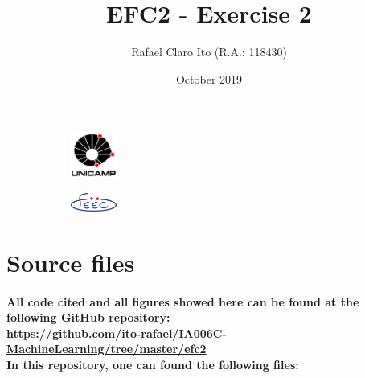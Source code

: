 \documentclass[a4paper]{article}    %
\begin{document}
\begin{figure}
    \centering
    \begin{subfigure}{0.45\textwidth}
        \centering
        \includegraphics[width=1.5cm]{unicamp}
    \end{subfigure}
    \hfill
    \begin{subfigure}{0.45\textwidth}
        \centering
        \includegraphics[width=1.5cm]{feec}
    \end{subfigure}
\end{figure}

\title{EFC2 - Exercise 2}
\author{Rafael Claro Ito (R.A.: 118430)}
\date{October 2019}
\maketitle
\newpage

\section{Source files}

\paragraph{All code cited and all figures showed here can be found at the following GitHub repository:\\
\url{https://github.com/ito-rafael/IA006C-MachineLearning/tree/master/efc2}\\
In this repository, one can found the following files:\\}
\end{document}
